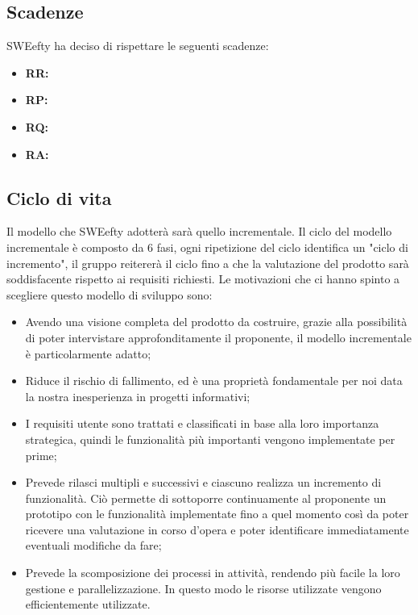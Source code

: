	\subsection{Scadenze}
	SWEefty ha deciso di rispettare le seguenti scadenze:
	\begin{itemize}
		\item \textbf{RR:}
		\item \textbf{RP:}
		\item \textbf{RQ:}
		\item \textbf{RA:}
	\end{itemize}
	\subsection{Ciclo di vita}	
	Il modello che SWEefty adotterà sarà quello incrementale. Il ciclo del modello incrementale è composto da 6 fasi, ogni ripetizione del ciclo identifica un "ciclo di incremento", il gruppo reitererà il ciclo fino a che la valutazione del prodotto sarà soddisfacente rispetto ai requisiti richiesti.
	Le motivazioni che ci hanno spinto a scegliere questo modello di sviluppo sono:
	\begin{itemize}
		\item Avendo una visione completa del prodotto da costruire, grazie alla possibilità di poter intervistare approfonditamente il proponente, il modello incrementale è particolarmente adatto;
		\item Riduce il rischio di fallimento, ed è una proprietà fondamentale per noi data la nostra inesperienza in progetti informativi;
		\item I requisiti utente sono trattati e classificati in base alla loro importanza strategica, quindi le funzionalità più importanti vengono implementate per prime;
		\item Prevede rilasci multipli e successivi e ciascuno realizza un incremento di funzionalità. Ciò permette di sottoporre continuamente al proponente un prototipo con le funzionalità implementate fino a quel momento così da poter ricevere una valutazione in corso d'opera e poter identificare immediatamente eventuali modifiche da fare;
		\item Prevede la scomposizione dei processi in attività, rendendo più facile la loro gestione e parallelizzazione. In questo modo le risorse utilizzate vengono efficientemente utilizzate.
	\end{itemize}
